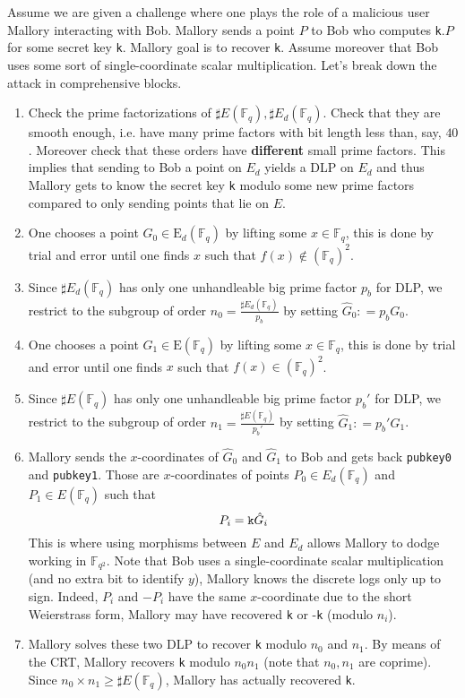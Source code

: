 \documentclass[10pt]{article}
\theoremstyle{definition}
\newcommand{\F}{\mathbb{F}}
\newcommand{\E}{\textrm{E}}
\begin{document}
\noindent Assume we are given a challenge where one plays the role of a malicious user Mallory interacting with Bob.
Mallory sends a point $P$ to Bob who computes \verb|k|$.P$ for some secret key \verb|k|.
Mallory goal is to recover \verb|k|.
Assume moreover that Bob uses some sort of single-coordinate scalar multiplication.
Let's break down the attack in comprehensive blocks.

\begin{enumerate}
\item Check the prime factorizations of $\sharp{}E(\F_q), \sharp{}E_d(\F_q)$.
Check that they are smooth enough, i.e. have many prime factors with bit length less than, say, $40$.
Moreover check that these orders have \textbf{different} small prime factors.
This implies that sending to Bob a point on $E_d$ yields a DLP on $E_d$ and thus Mallory gets to know the secret key \verb|k| modulo some new prime factors compared to only sending points that lie on $E$.
\item One chooses a point $G_0 \in \E_d(\F_q)$ by lifting some $x\in \F_q$, this is done by trial and error until one finds $x$ such that $f(x) \notin (\F_q)^2$. 
\item Since $\sharp{}E_d(\F_q)$ has only one unhandleable big prime factor $p_b$ for DLP, we restrict to the subgroup of order $n_0 = \frac{\sharp{}E_d(\F_q)}{p_b}$ by setting $\hat{G}_0 : = p_b G_0$.
\item One chooses a point $G_1 \in \E(\F_q)$ by lifting some $x\in \F_q$, this is done by trial and error until one finds $x$ such that $f(x) \in (\F_q)^2$. 
\item Since $\sharp{}E(\F_q)$ has only one unhandleable big prime factor $p_b'$ for DLP, we restrict to the subgroup of order $n_1 = \frac{\sharp{}E(\F_q)}{p_b'}$ by setting $\hat{G}_1 : = p_b' G_1$.
\item Mallory sends the $x$-coordinates of $\hat{G}_0$ and $\hat{G}_1$ to Bob and gets back \verb|pubkey0| and \verb|pubkey1|.
Those are $x$-coordinates of points $P_0 \in E_d(\F_q)$ and $P_1 \in E(\F_q)$ such that 
\[ P_i = \verb|k|\hat{G}_i \]
This is where using morphisms between $E$ and $E_d$ allows Mallory to dodge working in $\F_{q^2}$.
Note that Bob uses a single-coordinate scalar multiplication (and no extra bit to identify $y$), Mallory knows the discrete logs only up to sign. 
Indeed, $P_i$ and $-P_i$ have the same $x$-coordinate due to the short Weierstrass form, Mallory may have recovered \verb|k| or -\verb|k| (modulo $n_i$).
\item Mallory solves these two DLP to recover \verb|k| modulo $n_0$  and $n_1$.
By means of the CRT, Mallory recovers \verb|k| modulo $n_0n_1$ (note that $n_0, n_1$ are coprime).
Since $n_0 \times n_1 \geq \sharp{}E(\F_q)$, Mallory has actually recovered \verb|k|.


\end{enumerate}
\end{document}
